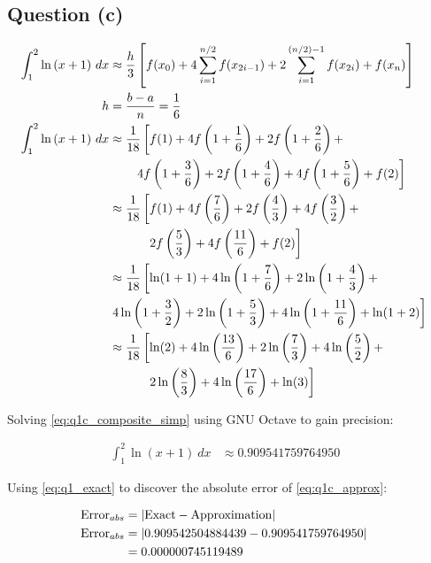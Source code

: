 	\subsection{Question (c)}
		\begin{align}
			\int_{1}^{2}\ln{(x+1)} \ dx &\approx  \frac{h}{3}\left[
			f(x_{0})+
			4 \sum_{i=1}^{n/2} f(x_{2i-1}) +
			2 \sum_{i=1}^{(n/2)-1} f(x_{2i}) +
			f(x_{n})
			\right]& \\
			h &= \frac{b-a}{n} = \frac{1}{6}& \\
			\int_{1}^{2}\ln{(x+1)} \ dx	 &\approx  \frac{1}{18}\left[
				f(1)+
				4f\left(1+\frac{1}{6}\right)+
				2f\left(1+\frac{2}{6}\right)+
				\right.& \notag \\ &\left. \quad \quad
				4f\left(1+\frac{3}{6}\right)+
				2f\left(1+\frac{4}{6}\right)+
				4f\left(1+\frac{5}{6}\right)+
				f(2)
			\right]& \notag \\
			&\approx \frac{1}{18}\left[
				f(1)+
				4f\left(\frac{7}{6}\right)+
				2f\left(\frac{4}{3}\right)+
				4f\left(\frac{3}{2}\right)+
				\right.& \notag \\ &\left. \quad \quad \quad
				2f\left(\frac{5}{3}\right)+
				4f\left(\frac{11}{6}\right)+
				f(2)
			\right]& \\
			&\approx \frac{1}{18}\left[
				\ln(1+1)+
				4\ln\left(1+\frac{7}{6}\right)+
				2\ln\left(1+\frac{4}{3}\right)+
				\right.& \notag \\ &\left.
				4\ln\left(1+\frac{3}{2}\right)+
				2\ln\left(1+\frac{5}{3}\right)+
				4\ln\left(1+\frac{11}{6}\right)+
				\ln(1+2)
			\right]& \notag \\
			&\approx \frac{1}{18}\left[
				\ln(2)+
				4\ln\left(\frac{13}{6}\right)+
				2\ln\left(\frac{7}{3}\right)+
				4\ln\left(\frac{5}{2}\right)+
				\right.& \notag \\ &\left. \quad \quad \quad
				2\ln\left(\frac{8}{3}\right)+
				4\ln\left(\frac{17}{6}\right)+
				\ln(3)
			\right]& \label{eq:q1c_composite_simp}
		\end{align}

		Solving \cref{eq:q1c_composite_simp} using GNU Octave to gain precision:

		\begin{align}
			\int_{1}^{2}\ln{(x+1)} \ dx &\approx 0.909541759764950& \label{eq:q1c_approx}
		\end{align}

		Using \cref{eq:q1_exact} to discover the absolute error of \cref{eq:q1c_approx}:

		\begin{align}
			\text{Error}_{abs} &= |\text{Exact} - \text{Approximation}|& \\
			\text{Error}_{abs} &= |0.909542504884439 - 0.909541759764950|& \notag \\
			&= 0.000000745119489&
		\end{align}

